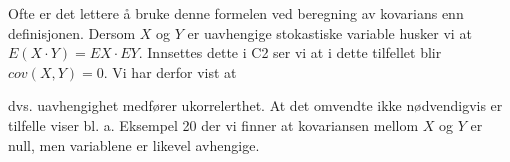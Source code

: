 \noindent Ofte er det lettere å bruke denne formelen ved beregning av
kovarians enn definisjonen. Dersom $X$ og $Y$ er uavhengige
stokastiske variable husker vi at $E(X\cdot Y)=EX \cdot EY$. Innsettes
dette i C2 ser vi at i dette tilfellet blir $cov(X,Y)=0$. Vi har
derfor vist at

\begin{center} \framebox[10cm]{\begin{minipage}{9cm}
\[ \mbox{\ \ \ C4. \ \ \ \ }p(x,y)=p_1(x)\cdot p_2(y)
                               \mbox{ medfører } cov(X,Y)=0  \]
\mbox{}\end{minipage}} \end{center}

\noindent dvs. uavhengighet medfører ukorrelerthet. At det omvendte ikke
nødven\-dig\-vis er tilfelle viser bl. a. Eksempel 20 der vi finner
at kovariansen mellom $X$ og $Y$ er null, men variablene er
likevel avhengige.\\

